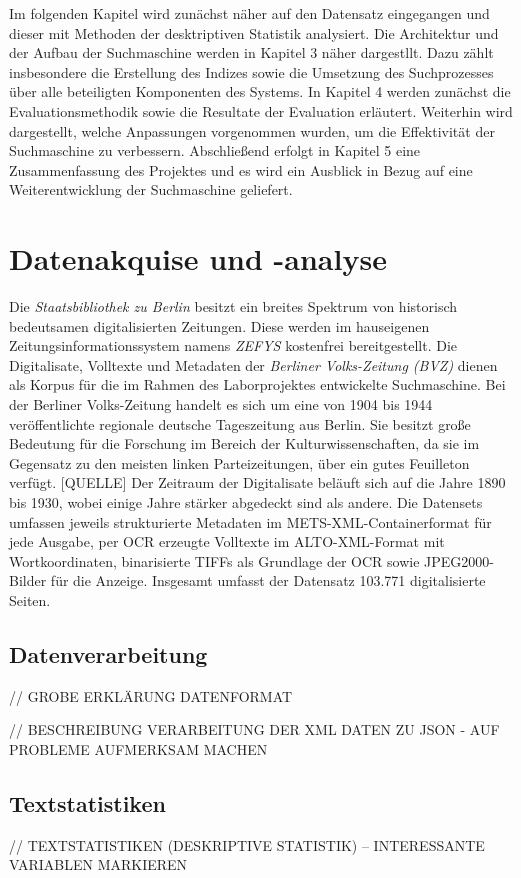 \documentclass[11pt,a4paper, halfparskip]{scrartcl}
\begin{document}
Im folgenden Kapitel wird zunächst näher auf den Datensatz eingegangen und dieser mit Methoden der desktriptiven Statistik analysiert.
Die Architektur und der Aufbau der Suchmaschine werden in Kapitel 3 näher dargestllt. 
Dazu zählt insbesondere die Erstellung des Indizes sowie die Umsetzung des Suchprozesses über alle beteiligten Komponenten des Systems.
In Kapitel 4 werden zunächst die Evaluationsmethodik sowie die Resultate der Evaluation erläutert.
Weiterhin wird dargestellt, welche Anpassungen vorgenommen wurden, um die Effektivität der Suchmaschine zu verbessern.
Abschließend erfolgt in Kapitel 5 eine Zusammenfassung des Projektes und es wird ein Ausblick in Bezug auf eine Weiterentwicklung der Suchmaschine geliefert.

\section{Datenakquise und -analyse}

Die \textit{Staatsbibliothek zu Berlin} besitzt ein breites Spektrum von historisch bedeutsamen digitalisierten Zeitungen.
Diese werden im hauseigenen Zeitungsinformationssystem namens \textit{ZEFYS} kostenfrei bereitgestellt.
Die Digitalisate, Volltexte und Metadaten der \textit{Berliner Volks-Zeitung (BVZ)} dienen als Korpus für die im Rahmen des Laborprojektes entwickelte Suchmaschine.
Bei der Berliner Volks-Zeitung handelt es sich um eine von 1904 bis 1944 veröffentlichte regionale deutsche Tageszeitung aus Berlin.
Sie besitzt große Bedeutung für die Forschung im Bereich der Kulturwissenschaften, da sie im Gegensatz zu den meisten linken Parteizeitungen, über ein gutes Feuilleton verfügt. [QUELLE]
Der Zeitraum der Digitalisate beläuft sich auf die Jahre 1890 bis 1930, wobei einige Jahre stärker abgedeckt sind als andere.
Die Datensets umfassen jeweils strukturierte Metadaten im METS-XML-Containerformat für jede Ausgabe, per OCR erzeugte Volltexte im ALTO-XML-Format mit Wortkoordinaten, binarisierte TIFFs als Grundlage der OCR sowie JPEG2000-Bilder für die Anzeige.
Insgesamt umfasst der Datensatz 103.771 digitalisierte Seiten.

\subsection{Datenverarbeitung}
// GROBE ERKLÄRUNG DATENFORMAT 

// BESCHREIBUNG VERARBEITUNG DER XML DATEN ZU JSON - AUF PROBLEME AUFMERKSAM MACHEN

\subsection{Textstatistiken}
// TEXTSTATISTIKEN (DESKRIPTIVE STATISTIK) – INTERESSANTE VARIABLEN MARKIEREN
\end{document}
